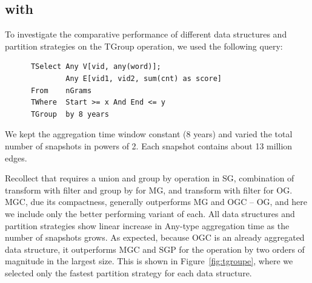 \subsection{ with }

To investigate the comparative performance of different data
structures and partition strategies on the TGroup operation, we used
the following query:

\begin{small}
\begin{verbatim}
      TSelect Any V[vid, any(word)];
              Any E[vid1, vid2, sum(cnt) as score]
      From    nGrams
      TWhere  Start >= x And End <= y
      TGroup  by 8 years
\end{verbatim}
\end{small}

We kept the aggregation time window constant (8 years) and varied the
total number of snapshots in powers of 2.  Each snapshot contains
about 13 million edges.

Recollect that  requires a union and group by operation
in SG, combination of transform with filter and group by for MG, and
transform with filter for OG.  MGC, due its compactness, generally
outperforms MG and OGC -- OG, and here we include only the better
performing variant of each.  All data structures and partition
strategies show linear increase in Any-type aggregation time as the
number of snapshots grows.  As expected, because OGC is an already
aggregated data structure, it outperforms MGC and SGP for the
 operation by two orders of magnitude in the largest
size.  This is shown in Figure~\ref{fig:tgroupe}, where we selected
only the fastest partition strategy for each data structure.  

